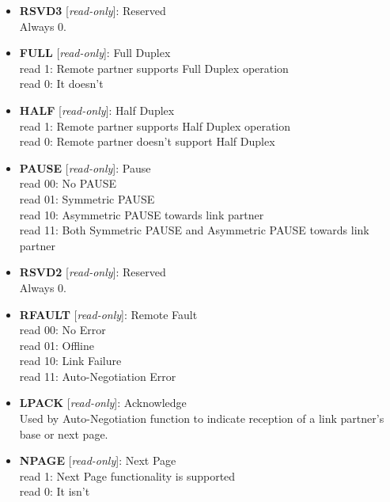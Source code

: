 \begin{itemize}
\item \begin{small}
{\bf 
RSVD3
} [\emph{read-only}]: Reserved
\\
Always 0.
\end{small}
\item \begin{small}
{\bf 
FULL
} [\emph{read-only}]: Full Duplex
\\
read 1: Remote partner supports Full Duplex operation\\				                read 0: It doesn't
\end{small}
\item \begin{small}
{\bf 
HALF
} [\emph{read-only}]: Half Duplex
\\
read 1: Remote partner supports Half Duplex operation\\				                read 0: Remote partner doesn't support Half Duplex
\end{small}
\item \begin{small}
{\bf 
PAUSE
} [\emph{read-only}]: Pause
\\
read 00: No PAUSE\\				                read 01: Symmetric PAUSE \\				                read 10: Asymmetric PAUSE towards link partner\\				                read 11: Both Symmetric PAUSE and Asymmetric PAUSE towards link partner
\end{small}
\item \begin{small}
{\bf 
RSVD2
} [\emph{read-only}]: Reserved
\\
Always 0.
\end{small}
\item \begin{small}
{\bf 
RFAULT
} [\emph{read-only}]: Remote Fault
\\
read 00: No Error \\				                read 01: Offline \\				                read 10: Link Failure \\				                read 11: Auto-Negotiation Error
\end{small}
\item \begin{small}
{\bf 
LPACK
} [\emph{read-only}]: Acknowledge
\\
Used by Auto-Negotiation function to indicate reception of a link partner's base or next page.
\end{small}
\item \begin{small}
{\bf 
NPAGE
} [\emph{read-only}]: Next Page
\\
read 1: Next Page functionality is supported\\				                read 0: It isn't
\end{small}
\end{itemize}
